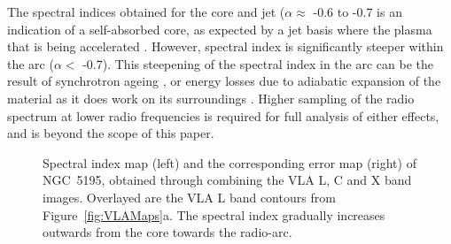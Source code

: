 \documentclass[fleqn,usenatbib]{mnras}
\def\fig{Figure}
\begin{document}
{The spectral indices obtained for the core and jet ($\alpha \approx$ -0.6 to -0.7 is an indication of a self-absorbed core, as expected by a jet basis where the plasma that is being accelerated \citep{NWF01}. However, spectral index is significantly steeper within the arc ($\alpha <$ -0.7). This steepening of the spectral index in the arc can be the result of synchrotron ageing \citep{CPDL91}, or energy losses due to adiabatic expansion of the material as it does work on its surroundings \citep{CPDL91}. Higher sampling of the radio spectrum at lower radio frequencies is required for full analysis of either effects, and is beyond the scope of this paper.}

\begin{figure}
{\centering
{} \hspace{2em}

\caption{Spectral index map (left) and the corresponding error map (right) of NGC~5195, obtained through combining the VLA L, C and X band images. Overlayed are the VLA L band contours from \fig~\ref{fig:VLAMaps}a. The spectral index gradually increases outwards from the core towards the radio-arc.}
\label{fig:Specind}
}
\end{figure}
\end{document}
